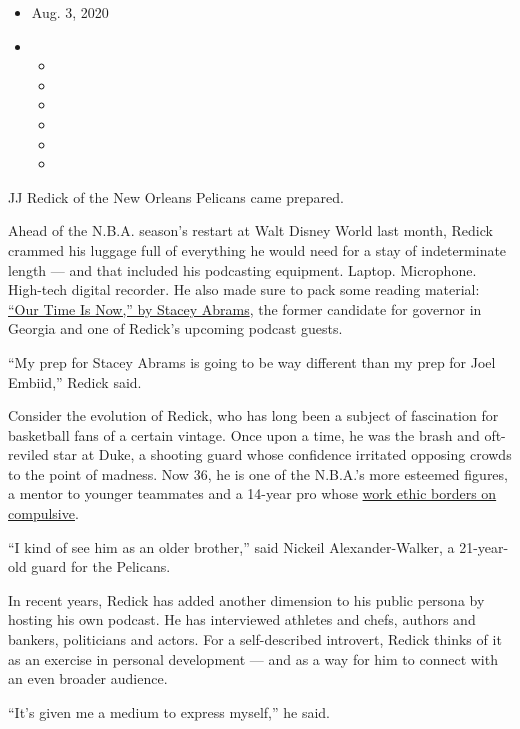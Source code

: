 \begin{itemize}
\item
  Aug. 3, 2020
\item
  \begin{itemize}
  \item
  \item
  \item
  \item
  \item
  \item
  \end{itemize}
\end{itemize}

JJ Redick of the New Orleans Pelicans came prepared.

Ahead of the N.B.A. season's restart at Walt Disney World last month,
Redick crammed his luggage full of everything he would need for a stay
of indeterminate length --- and that included his podcasting equipment.
Laptop. Microphone. High-tech digital recorder. He also made sure to
pack some reading material:
\href{https://www.nytimes3xbfgragh.onion/2020/06/04/books/review/our-time-is-now-stacey-abrams.html}{``Our
Time Is Now,'' by Stacey Abrams}, the former candidate for governor in
Georgia and one of Redick's upcoming podcast guests.

``My prep for Stacey Abrams is going to be way different than my prep
for Joel Embiid,'' Redick said.

Consider the evolution of Redick, who has long been a subject of
fascination for basketball fans of a certain vintage. Once upon a time,
he was the brash and oft-reviled star at Duke, a shooting guard whose
confidence irritated opposing crowds to the point of madness. Now 36, he
is one of the N.B.A.'s more esteemed figures, a mentor to younger
teammates and a 14-year pro whose
\href{https://www.nytimes3xbfgragh.onion/2018/03/21/sports/jj-redick-sixers.html}{work
ethic borders on compulsive}.

``I kind of see him as an older brother,'' said Nickeil
Alexander-Walker, a 21-year-old guard for the Pelicans.

In recent years, Redick has added another dimension to his public
persona by hosting his own podcast. He has interviewed athletes and
chefs, authors and bankers, politicians and actors. For a self-described
introvert, Redick thinks of it as an exercise in personal development
--- and as a way for him to connect with an even broader audience.

``It's given me a medium to express myself,'' he said.

